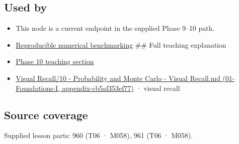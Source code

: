 \subsection{Used by}\label{used-by}

\begin{itemize}
\item
  This node is a current endpoint in the supplied Phase 9--10 path.
\item
  \hyperref[appendix-b9db93e28371]{Reproducible numerical benchmarking} \#\# Full teaching explanation
\item
  \href{Continuous\%20Notes/Computing\%20Foundations\%20-\%20From\%20Bits\%20to\%20C++\%20and\%20Systems\%20APIs\#10.\%20Inference\%20and\%20error\%20metrics\%20need\%20explicit\%20assumptions}{Phase 10 teaching section}
\item
  \href{}{Visual Recall/10 - Probability and Monte Carlo - Visual Recall.md (01-Foundations-I, appendix-cb5af353ef77)} · visual recall
\end{itemize}

\subsection{Source coverage}\label{source-coverage}

Supplied lesson parts: 960 (T06 · M058), 961 (T06 · M058).
